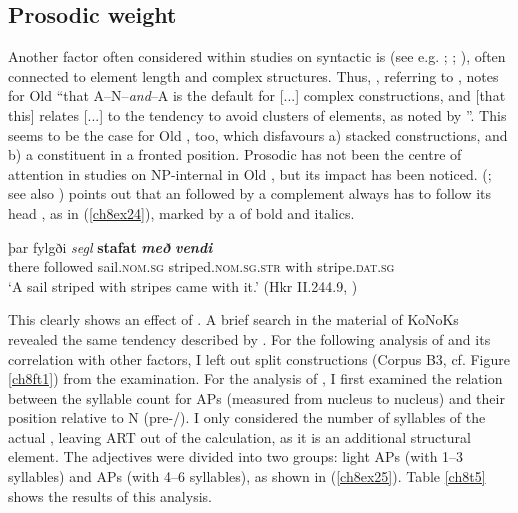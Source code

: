 \documentclass[output=paper,colorlinks,citecolor=brown]{langscibook}
\begin{document}
\subsection{Prosodic weight}\label{ch8s3.5}
Another factor often considered within studies on syntactic  is
 (see e.g. \citealp{Hróarsdóttir2009}; \citealp{Hinterhölzl2009}; \citealp{HinterhölzlPetrova2018}), often connected to element length and
complex structures. Thus, \citet[45]{Bech19}, referring to \citet{Grabski17},
notes for Old  ``that A--N--\emph{and}--A is the default 
for {[}...{]} complex constructions, and {[}that this{]} relates
{[}...{]} to the tendency to avoid  clusters of elements, as noted
by \citet{Mitchell85}''. This seems to be the case for Old , too, which disfavours a) stacked  constructions, and b) a 
constituent in a fronted position. Prosodic  has not been  the
centre of attention in studies on NP-internal  in Old , but
its impact has been noticed. \citeauthor{Faarlund04} (\citeyear[71]{Faarlund04}; see also \citealp[e13f]{Borjarsetal16}) points out that an  followed by a complement
always has to follow its head , as in (\ref{ch8ex24}), marked by a  of bold and italics.

\begin{exe}
\ex\label{ch8ex24}
\gll þar fylgði \textit{segl} \textbf{stafat} \textit{\textbf{með}} \textit{\textbf{vendi}} \\
there followed sail.\textsc{nom.sg} striped.\textsc{nom.sg.str} with stripe.\textsc{dat.sg}\\
\glt `A sail striped with stripes came with it.' (Hkr II.244.9, \citealp[71]{Faarlund04})
\end{exe}

This clearly shows an effect of . A brief search in
the  material of KoNoKs revealed the same tendency  described by \citet[71]{Faarlund04}. For the following analysis of  and
its correlation with other factors, I left out split constructions (Corpus B3, cf. Figure \ref{ch8ft1}) from the examination. For the analysis of , I
first examined the relation between the syllable count for APs (measured
from nucleus to nucleus) and their position relative to N
(pre-/). I only considered the number of syllables of the actual , leaving ART out of the calculation, as it is an
additional structural element. The adjectives were divided into two
groups: light APs (with 1--3 syllables) and  APs (with 4--6
syllables), as shown in (\ref{ch8ex25}). Table \ref{ch8t5} shows the results of this analysis.
\end{document}
